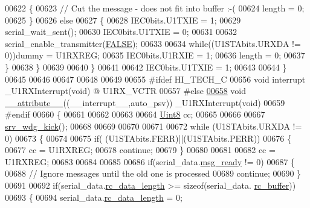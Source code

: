 \begin{DoxyCode}
{{{{{{00622             \{
00623                 \textcolor{comment}{// Cut the message - does not fit into buffer :-(}
00624                 length = 0;
00625             \}
00626             \textcolor{keywordflow}{else}
00627             \{
00628                 IEC0bits.U1TXIE   = 1;
00629                 serial\_wait\_sent();
00630                 IEC0bits.U1TXIE   = 0;
00631 
00632                 serial\_enable\_transmitter(\hyperlink{a00038_aa93f0eb578d23995850d61f7d61c55c1}{FALSE});
00633 
00634                 \textcolor{keywordflow}{while}((U1STAbits.URXDA != 0))dummy = U1RXREG;
00635                 IEC0bits.U1RXIE   = 1;
00636                 length = 0;
00637             \}
00638         \}
00639 
00640     \}
00641 
00642     IEC0bits.U1TXIE   = 1;
00643 
00644 \}
00645 
00646 
00647 
00648 
00649 
00655 \textcolor{preprocessor}{#ifdef HI\_TECH\_C}
00656 \textcolor{keywordtype}{void} interrupt \_U1RXInterrupt(\textcolor{keywordtype}{void}) @ U1RX\_VCTR
00657 \textcolor{preprocessor}{#else}
\hypertarget{a00028_source_l00658}{}\hyperlink{a00028_a2068c3c2584547dbc1c8b9bca2d55b18}{00658} \textcolor{keywordtype}{void} \hyperlink{a00028_a2068c3c2584547dbc1c8b9bca2d55b18}{\_\_attribute\_\_}((\_\_interrupt\_\_,auto\_psv)) \_U1RXInterrupt(\textcolor{keywordtype}{void})
00659 \textcolor{preprocessor}{#endif}
00660 \{
00661      
00662 
00663      
00664     \hyperlink{a00070_af84840501dec18061d18a68c162a8fa2}{Uint8} cc;
00665     
00666     
00667    \hyperlink{a00065_a710d148845397582739d170341f3d3d9}{srv\_wdg\_kick}();
00668    
00669 
00670 
00671    
00672   \textcolor{keywordflow}{while} (U1STAbits.URXDA != 0)
00673     \{
00674         
00675         \textcolor{keywordflow}{if}( (U1STAbits.FERR)||(U1STAbits.PERR))
00676         \{
00677             cc = U1RXREG;
00678             \textcolor{keywordflow}{continue};
00679         \}
00680 
00681      
00682         cc = U1RXREG;
00683     
00684       
00685 
00686         \textcolor{keywordflow}{if}(serial\_data.\hyperlink{a00028_ac0789a6c9ab7ccd13d6f04ae31496854}{msg\_ready} != 0)
00687         \{
00688             \textcolor{comment}{// Ignore messages until the old one is processed}
00689             \textcolor{keywordflow}{continue};
00690         \}
00691 
00692         \textcolor{keywordflow}{if}(serial\_data.\hyperlink{a00028_ab136d4fef2c523afd55b6ca74c46d7cc}{rc\_data\_length} >= \textcolor{keyword}{sizeof}(serial\_data.
      \hyperlink{a00028_ac734cb8be27f86bd99edc539434883a4}{rc\_buffer}))
00693         \{
00694             serial\_data.\hyperlink{a00028_ab136d4fef2c523afd55b6ca74c46d7cc}{rc\_data\_length} = 0;
}}}}}}
\end{DoxyCode}
